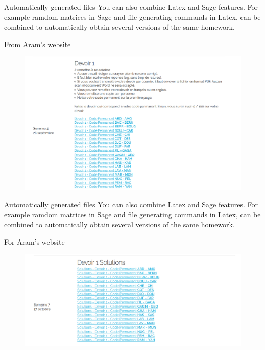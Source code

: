 \documentclass[10pts]{beamer}
\begin{document}
	\begin{frame}{Automatically generated files}
		You can also combine Latex and Sage features. For example ramdom matrices in Sage and file generating commands in Latex, can be combined to automatically obtain several versions of the same homework. \newline
		
		\footnotesize{From Aram's website}
		\begin{figure}[h]
			\centering
			\includegraphics[scale=.2]{img1.png}
		\end{figure}
		
	\end{frame}
	\begin{frame}{Automatically generated files}
	You can also combine Latex and Sage features. For example ramdom matrices in Sage and file generating commands in Latex, can be combined to automatically obtain several versions of the same homework. \newline
	
	\footnotesize{For Aram's website}
	\begin{figure}[h]
		\centering
		\includegraphics[scale=.2]{img2.png}
	\end{figure}
	
	\end{frame}
\end{document}

